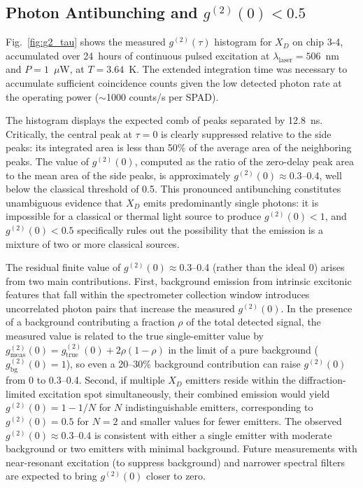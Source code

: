 \subsection{Photon Antibunching and $g^{(2)}(0) < 0.5$}
\label{subsec:Photon Antibunching and g2(0) < 0.5}

Fig.~\ref{fig:g2_tau} shows the measured $g^{(2)}(\tau)$ histogram for $X_D$ on chip 3-4, accumulated over 24~hours of continuous pulsed excitation at $\lambda_{\mathrm{laser}} = 506$~nm and $P = 1$~$\mu$W, at $T = 3.64$~K. The extended integration time was necessary to accumulate sufficient coincidence counts given the low detected photon rate at the operating power ($\sim$1000 counts/s per SPAD).

The histogram displays the expected comb of peaks separated by 12.8~ns. Critically, the central peak at $\tau = 0$ is clearly suppressed relative to the side peaks: its integrated area is less than 50\% of the average area of the neighboring peaks. The value of $g^{(2)}(0)$, computed as the ratio of the zero-delay peak area to the mean area of the side peaks, is approximately $g^{(2)}(0) \approx 0.3$--0.4, well below the classical threshold of 0.5. This pronounced antibunching constitutes unambiguous evidence that $X_D$ emits predominantly single photons: it is impossible for a classical or thermal light source to produce $g^{(2)}(0) < 1$, and $g^{(2)}(0) < 0.5$ specifically rules out the possibility that the emission is a mixture of two or more classical sources.

The residual finite value of $g^{(2)}(0) \approx 0.3$--0.4 (rather than the ideal 0) arises from two main contributions. First, background emission from intrinsic excitonic features that fall within the spectrometer collection window introduces uncorrelated photon pairs that increase the measured $g^{(2)}(0)$. In the presence of a background contributing a fraction $\rho$ of the total detected signal, the measured value is related to the true single-emitter value by $g^{(2)}_{\mathrm{meas}}(0) = g^{(2)}_{\mathrm{true}}(0) + 2\rho(1-\rho)$ in the limit of a pure background ($g^{(2)}_{\mathrm{bg}}(0) = 1$), so even a 20--30\% background contribution can raise $g^{(2)}(0)$ from 0 to 0.3--0.4. Second, if multiple $X_D$ emitters reside within the diffraction-limited excitation spot simultaneously, their combined emission would yield $g^{(2)}(0) = 1 - 1/N$ for $N$ indistinguishable emitters, corresponding to $g^{(2)}(0) = 0.5$ for $N = 2$ and smaller values for fewer emitters. The observed $g^{(2)}(0) \approx 0.3$--0.4 is consistent with either a single emitter with moderate background or two emitters with minimal background. Future measurements with near-resonant excitation (to suppress background) and narrower spectral filters are expected to bring $g^{(2)}(0)$ closer to zero.

